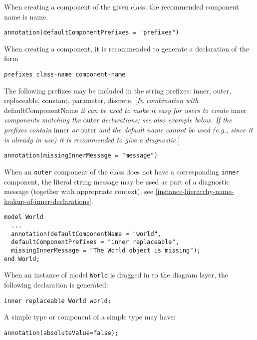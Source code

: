 When creating a component of the given class, the recommended component
name is name.
\begin{lstlisting}[language=modelica]
  annotation(defaultComponentPrefixes = "prefixes")
\end{lstlisting}

When creating a component, it is recommended to generate a declaration
of the form
\begin{lstlisting}[language=modelica]
  prefixes class-name component-name
\end{lstlisting}

The following prefixes may be included in the string prefixes: inner,
outer, replaceable, constant, parameter, discrete. {[}\emph{In
combination with} defaultComponentName \emph{it can be used to make it
easy for users to create} inner \emph{components matching the} outer
\emph{declarations; see also example below. If the prefixes contain} inner \emph{or} outer
\emph{and the default name cannot be used (e.g., since it is already in use) it is recommended to give a diagnostic.}{]}
\begin{lstlisting}[language=modelica]
  annotation(missingInnerMessage = "message")
\end{lstlisting}

When an \lstinline!outer! component of the class does not have a corresponding \lstinline!inner!
component, the literal string message may be used as part of a diagnostic message (together with appropriate context), see
\autoref{instance-hierarchy-name-lookup-of-inner-declarations}.

\begin{example}
\begin{lstlisting}[language=modelica]
model World
  ...
  annotation(defaultComponentName = "world",
  defaultComponentPrefixes = "inner replaceable",
  missingInnerMessage = "The World object is missing");
end World;
\end{lstlisting}
When an instance of model \lstinline!World! is dragged in to the diagram layer, the
following declaration is generated:
\begin{lstlisting}[language=modelica]
  inner replaceable World world;
\end{lstlisting}
\end{example}

A simple type or component of a simple type may have:
\begin{lstlisting}[language=modelica]
  annotation(absoluteValue=false);
\end{lstlisting}


